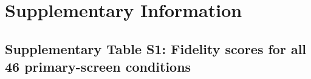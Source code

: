 \documentclass[times,twoside]{zHenriquesLab-StyleBioRxiv}
\begin{document}
\clearpage
\onecolumn
\setcounter{figure}{0}
\setcounter{table}{0}
\renewcommand{\thefigure}{S\arabic{figure}}
\renewcommand{\thetable}{S\arabic{table}}

\section*{Supplementary Information}

\subsection*{Supplementary Table S1: Fidelity scores for all 46 primary-screen conditions}
\end{document}
